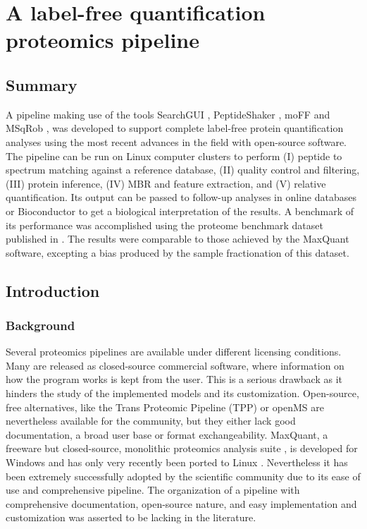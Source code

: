 \chapter{A label-free quantification proteomics pipeline}
\label{chap:pipeline}


\section*{Summary}

A pipeline making use of the tools SearchGUI \cite{Barsnes2018}, PeptideShaker \cite{Vaudel2015}, moFF \cite{Argentini2016} and MSqRob \cite{Goeminne2016}, was developed to support complete label-free protein quantification analyses using the most recent advances in the field with open-source software. The pipeline can be run on Linux computer clusters to perform (I) peptide to spectrum matching against a reference database, (II) quality control and filtering, (III) protein inference, (IV) \ac{MBR} and feature extraction, and (V) relative quantification. Its output can be passed to follow-up analyses in online databases or Bioconductor to get a biological interpretation of the results.  A benchmark of its performance was accomplished using the proteome benchmark dataset published in \cite{Cox2014}. The results were comparable to those achieved by the MaxQuant \cite{Cox2014} software, excepting a bias produced by the sample fractionation of this dataset.


\section{Introduction}

\subsection{Background}

Several proteomics pipelines are available under different licensing conditions. Many are released as closed-source commercial software, where information on how the program works is kept from the user. This is a serious drawback as it hinders the study of the implemented models and its customization. Open-source, free alternatives, like the Trans Proteomic Pipeline (\ac{TPP}) \cite{Deutsch2011} or openMS \cite{Sturm2008} are nevertheless available for the community, but they either lack good documentation, a broad user base or format exchangeability. MaxQuant, a freeware but closed-source, monolithic proteomics analysis suite \cite{Cox2008}, is developed for Windows and has only very recently been ported to Linux \cite{Sinitcyn2018}. Nevertheless it has been extremely successfully adopted by the scientific community due to its ease of use and comprehensive pipeline. The organization of a pipeline with comprehensive documentation, open-source nature, and easy implementation and customization was asserted to be lacking in the literature.

